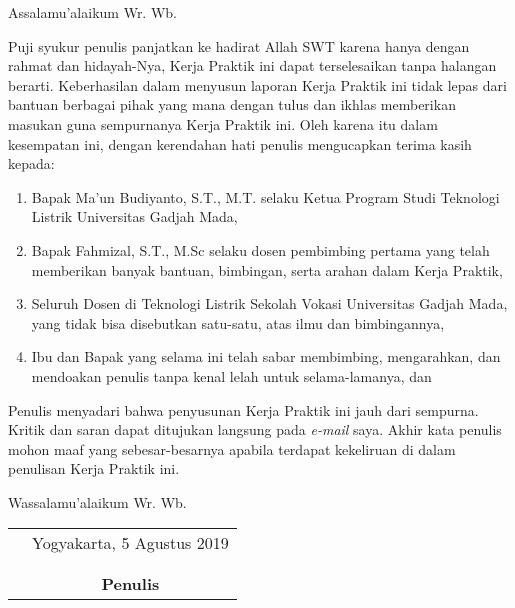 \documentclass{DTEDI_KP}
\begin{document}
\cover

\approvalpage



\preface
Assalamu'alaikum Wr. Wb.

\vspace{0.5cm}

Puji syukur penulis panjatkan ke hadirat Allah SWT karena hanya dengan rahmat dan hidayah-Nya, Kerja Praktik ini dapat terselesaikan tanpa halangan berarti. Keberhasilan dalam menyusun laporan Kerja Praktik ini tidak lepas dari bantuan berbagai pihak yang mana dengan tulus dan ikhlas memberikan masukan guna sempurnanya Kerja Praktik ini. Oleh karena itu dalam kesempatan ini, dengan kerendahan hati penulis mengucapkan terima kasih kepada:

\begin{enumerate}
\item{Bapak 	Ma'un Budiyanto, S.T., M.T. selaku Ketua  Program Studi Teknologi Listrik Universitas Gadjah Mada,}
\item{Bapak Fahmizal, S.T., M.Sc selaku dosen pembimbing pertama yang telah memberikan banyak bantuan, bimbingan, serta arahan dalam Kerja Praktik,}
\item{Seluruh Dosen di Teknologi Listrik Sekolah Vokasi Universitas Gadjah Mada, yang tidak bisa disebutkan satu-satu, atas ilmu dan bimbingannya,}
\item{Ibu dan Bapak yang selama ini telah sabar membimbing, mengarahkan, dan mendoakan penulis tanpa kenal lelah untuk selama-lamanya, dan}

\end{enumerate}

Penulis menyadari bahwa penyusunan Kerja Praktik ini jauh dari sempurna. Kritik dan saran dapat ditujukan langsung pada \emph{e-mail} saya. Akhir kata penulis mohon maaf yang sebesar-besarnya apabila terdapat kekeliruan di dalam penulisan Kerja Praktik ini.

\vspace{0.5cm}

Wassalamu'alaikum Wr. Wb.

\begin{tabular}{p{7.5cm}c}
&Yogyakarta, 5 Agustus 2019\\
&\\
&\\
&\textbf{Penulis}
\end{tabular}
\end{document}
